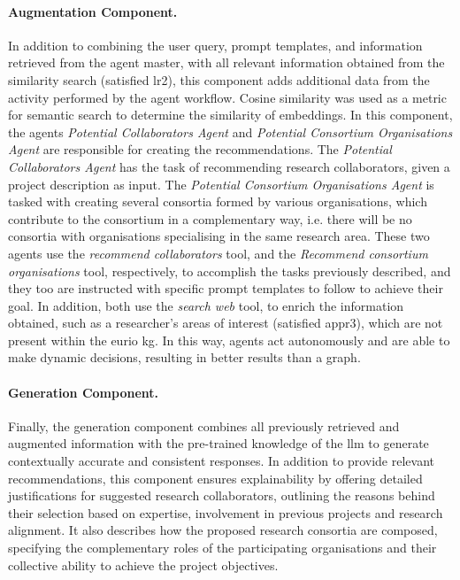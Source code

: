 \paragraph*{Augmentation Component.}
In addition to combining the user query, prompt templates, and information retrieved from the agent master, with all relevant information obtained from the similarity search (satisfied \gls{lr}2), this component adds additional data from the activity performed by the agent workflow.
Cosine similarity was used as a metric for semantic search to determine the similarity of embeddings.
In this component, the agents \textit{Potential Collaborators Agent} and \textit{Potential Consortium Organisations Agent} are responsible for creating the recommendations.
The \textit{Potential Collaborators Agent} has the task of recommending research collaborators, given a project description as input.
The \textit{Potential Consortium Organisations Agent} is tasked with creating several consortia formed by various organisations, which contribute to the consortium in a complementary way, i.e. there will be no consortia with organisations specialising in the same research area.
These two agents use the \textit{recommend collaborators} tool, and the \textit{Recommend consortium organisations} tool, respectively, to accomplish the tasks previously described, and they too are instructed with specific prompt templates to follow to achieve their goal.
In addition, both use the \textit{search web} tool, to enrich the information obtained, such as a researcher's areas of interest (satisfied \gls{appr}3), which are not present within the \gls{eurio} \gls{kg}.
In this way, agents act autonomously and are able to make dynamic decisions, resulting in better results than a graph.

\paragraph*{Generation Component.}
Finally, the generation component combines all previously retrieved and augmented information with the pre-trained knowledge of the \gls{llm} to generate contextually accurate and consistent responses.
In addition to provide relevant recommendations, this component ensures explainability by offering detailed justifications for suggested research collaborators, outlining the reasons behind their selection based on expertise, involvement in previous projects and research alignment.
It also describes how the proposed research consortia are composed, specifying the complementary roles of the participating organisations and their collective ability to achieve the project objectives.